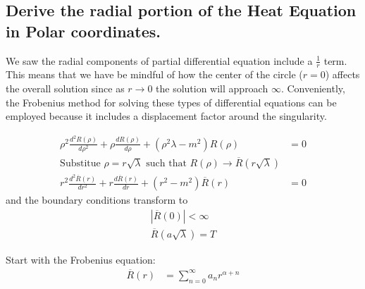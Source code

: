\documentclass[11pt]{article}
\def\lt{<}
\begin{document}
    \hypertarget{derive-the-radial-portion-of-the-heat-equation-in-polar-coordinates.}{%
\subsection{Derive the radial portion of the Heat Equation in Polar
coordinates.}\label{derive-the-radial-portion-of-the-heat-equation-in-polar-coordinates.}}

    We saw the radial components of partial differential equation include a
\(\frac{1}{r}\) term. This means that we have be mindful of how the
center of the circle (\(r = 0\)) affects the overall solution since as
\(r \rightarrow 0\) the solution will approach \(\infty\). Conveniently,
the Frobenius method for solving these types of differential equations
can be employed because it includes a displacement factor around the
singularity.

\begin{equation}
\begin{split} 
\rho^2 \frac {d^2 R(\rho)}{d \rho^2} + \rho \frac{d R(\rho)}{d\rho} + (\rho^2 \lambda - m^2)R(\rho) &= 0 \\
\text{Substitue $\rho = r \sqrt \lambda$ such that $R(\rho) \rightarrow \overline{R}(r \sqrt \lambda)$}  \\
r^2 \frac {d^2 \overline{R}(r)}{dr^2} + r\frac{d \overline{R}(r)}{dr} + (r^2 - m^2)\overline{R}(r) &= 0 
\end{split}
\end{equation} and the boundary conditions transform to \begin{equation}
\begin{split} 
| \overline{R}(0) | \lt \infty \\
\overline{R}(a \sqrt{\lambda}) = T
\end{split}
\end{equation}

Start with the Frobenius equation: \begin{equation}
\begin{split}
\overline{R}(r) & = \sum_{n=0}^{\infty} a_n r^{\alpha + n}
\end{split}
\end{equation}
\end{document}
